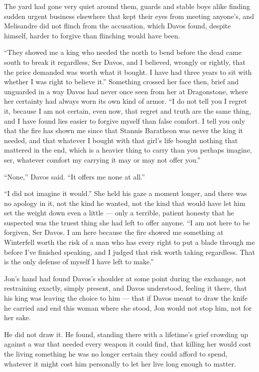 The yard had gone very quiet around them, guards and stable boys alike finding sudden urgent business elsewhere that kept their eyes from meeting anyone’s, and Melisandre did not flinch from the accusation, which Davos found, despite himself, harder to forgive than flinching would have been.

“They showed me a king who needed the north to bend before the dead came south to break it regardless, Ser Davos, and I believed, wrongly or rightly, that the price demanded was worth what it bought. I have had three years to sit with whether I was right to believe it.” Something crossed her face then, brief and unguarded in a way Davos had never once seen from her at Dragonstone, where her certainty had always worn its own kind of armor. “I do not tell you I regret it, because I am not certain, even now, that regret and truth are the same thing, and I have found lies easier to forgive myself than false comfort. I tell you only that the fire has shown me since that Stannis Baratheon was never the king it needed, and that whatever I bought with that girl’s life bought nothing that mattered in the end, which is a heavier thing to carry than you perhaps imagine, ser, whatever comfort my carrying it may or may not offer you.”

“None,” Davos said. “It offers me none at all.”

“I did not imagine it would.” She held his gaze a moment longer, and there was no apology in it, not the kind he wanted, not the kind that would have let him set the weight down even a little — only a terrible, patient honesty that he suspected was the truest thing she had left to offer anyone. “I am not here to be forgiven, Ser Davos. I am here because the fire showed me something at Winterfell worth the risk of a man who has every right to put a blade through me before I’ve finished speaking, and I judged that risk worth taking regardless. That is the only defense of myself I have left to make.”

\sceneBreak

Jon’s hand had found Davos’s shoulder at some point during the exchange, not restraining exactly, simply present, and Davos understood, feeling it there, that his king was leaving the choice to him — that if Davos meant to draw the knife he carried and end this woman where she stood, Jon would not stop him, not for her sake.

He did not draw it. He found, standing there with a lifetime’s grief crowding up against a war that needed every weapon it could find, that killing her would cost the living something he was no longer certain they could afford to spend, whatever it might cost him personally to let her live long enough to matter.

